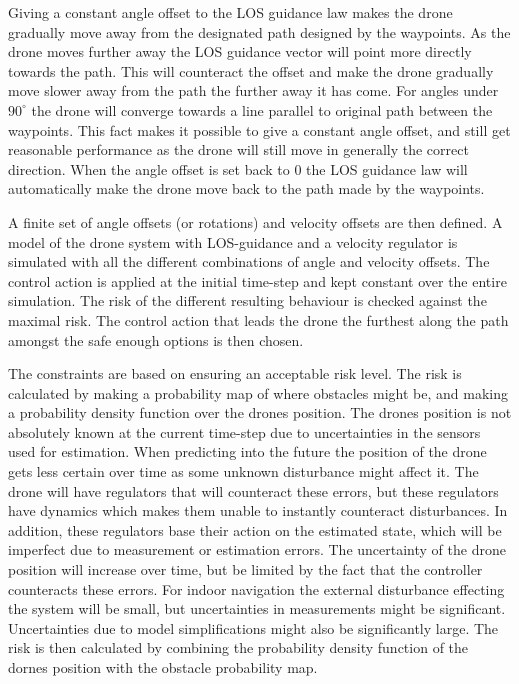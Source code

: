 Giving a constant angle offset to the LOS guidance law makes the drone gradually move away from the designated path designed by the waypoints. As the drone moves further away the LOS guidance vector will point more directly towards the path. This will counteract the offset and make the drone gradually move slower away from the path the further away it has come. For angles under $90^\circ$ the drone will converge towards a line parallel to original path between the waypoints. This fact makes it possible to give a constant angle offset, and still get reasonable performance as the drone will still move in generally the correct direction. When the angle offset is set back to 0 the LOS guidance law will automatically make the drone move back to the path made by the waypoints.

A finite set of angle offsets (or rotations) and velocity offsets are then defined. A model of the drone system with LOS-guidance and a velocity regulator is simulated with all the different combinations of angle and velocity offsets. The control action is applied at the initial time-step and kept constant over the entire simulation. The risk of the different resulting behaviour is checked against the maximal risk. The control action that leads the drone the furthest along the path amongst the safe enough options is then chosen. 

The constraints are based on ensuring an acceptable risk level. The risk is calculated by making a probability map of where obstacles might be, and making a probability density function over the drones position. The drones position is not absolutely known at the current time-step due to uncertainties in the sensors used for estimation. When predicting into the future the position of the drone gets less certain over time as some unknown disturbance might affect it. The drone will have regulators that will counteract these errors, but these regulators have dynamics which makes them unable to instantly counteract disturbances. In addition, these regulators base their action on the estimated state, which will be imperfect due to measurement or estimation errors. The uncertainty of the drone position will increase over time, but be limited by the fact that the controller counteracts these errors. For indoor navigation the external disturbance effecting the system will be small, but uncertainties in measurements might be significant. Uncertainties due to model simplifications might also be significantly large. The risk is then calculated by combining the probability density function of the dornes position with the obstacle probability map. 
